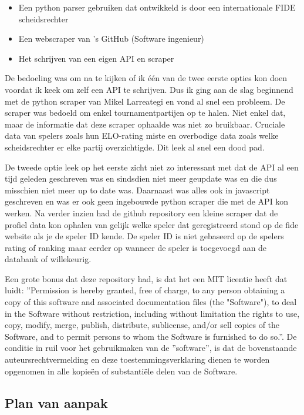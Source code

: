 \begin{itemize}
    \item Een python parser gebruiken dat ontwikkeld is door een internationale FIDE scheidsrechter \autocite{Larreategi}
    \item Een webscraper van \textcite{Alves2020}'s GitHub (Software ingenieur)
    \item Het schrijven van een eigen API en scraper
\end{itemize}

De bedoeling was om na te kijken of ik één van de twee eerste opties kon doen voordat ik keek om zelf een API te schrijven. Dus ik ging aan de slag beginnend met de python scraper van Mikel Larreategi en vond al snel een probleem. De scraper was bedoeld om enkel tournamentpartijen op te halen. Niet enkel dat, maar de informatie dat deze scraper ophaalde was niet zo bruikbaar. Cruciale data van spelers zoals hun ELO-rating miste en overbodige data zoals welke scheidsrechter er elke partij overzichtigde. Dit leek al snel een dood pad.

De tweede optie leek op het eerste zicht niet zo interessant met dat de API al een tijd geleden geschreven was en sindsdien niet meer geupdate was en die dus misschien niet meer up to date was. Daarnaast was alles ook in javascript geschreven en was er ook geen ingebouwde python scraper die met de API kon werken. Na verder inzien had de github repository een kleine scraper dat de profiel data kon ophalen van gelijk welke speler dat geregistreerd stond op de fide website als je de speler ID kende. De speler ID is niet gebaseerd op de spelers rating of ranking maar eerder op wanneer de speler is toegevoegd aan de databank of willekeurig. 

Een grote bonus dat deze repository had, is dat het een MIT licentie heeft dat luidt: ''Permission is hereby granted, free of charge, to any person obtaining a copy of this software and associated documentation files (the "Software"), to deal in the Software without restriction, including without limitation the rights to use, copy, modify, merge, publish, distribute, sublicense, and/or sell copies of the Software, and to permit persons to whom the Software is furnished to do so.''. De conditie in ruil voor het gebruikmaken van de ''software'', is dat de bovenstaande auteursrechtvermelding en deze toestemmingsverklaring dienen te worden opgenomen in alle kopieën of substantiële delen van de Software. 

\subsection{Plan van aanpak}

